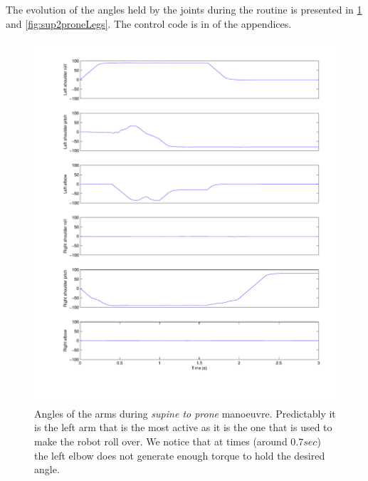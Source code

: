 The evolution of the angles held by the joints during the routine is presented in \cref{fig:sup2proneArms} and \cref{fig:sup2proneLegs}. The control code is in  of the appendices.

\begin{figure}[htp]
\centering
    \includegraphics[width = \textwidth]{figures/sup2proneArms}
    \caption[Angles of the arms during \emph{supine} to prone manoeuvre]{Angles of the arms during \emph{supine to prone} manoeuvre. Predictably it is the left arm that is the most active as it is the one that is used to make the robot roll over. We notice that at times (around $0.7sec$) the left elbow does not generate enough torque to hold the desired angle.}
    \label{fig:sup2proneArms}
\end{figure}

